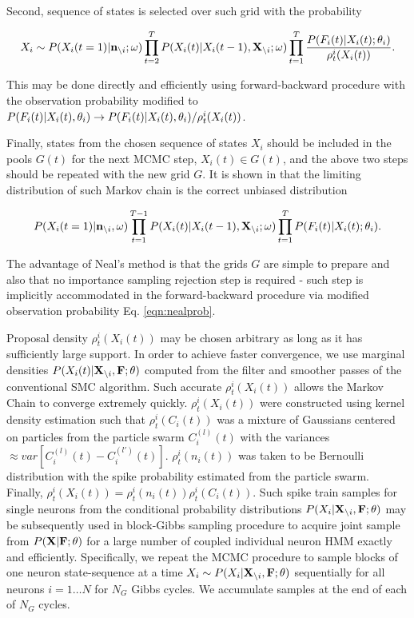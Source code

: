 Second, sequence of states is selected over such grid with the probability

\begin{equation}\label{eqn:nealprob}
X_i\sim P(X_i(t=1)|{\bf n}_{\backslash i}; \mathbf{\omega})\prod\limits_{t=2}^{T}P(X_i(t)|X_i(t-1), {\bf X}_{\backslash i}; \mathbf{\omega}) \prod\limits_{t=1}^{T}
\frac{P(F_i(t)|X_i(t); \mathbf{\theta}_i)}{\rho^i_t(X_i(t))}.
\end{equation}

This may be done directly and efficiently using forward-backward procedure with the observation probability modified to $P(F_i(t)|X_i(t), \mathbf{\theta}_i)\rightarrow P(F_i(t)|X_i(t), \mathbf{\theta}_i)/{\rho^i_t(X_i(t))}$.

Finally, states from the chosen sequence of states $X_i$ should be included in the pools $G(t)$ for the next MCMC step, $X_i(t)\in G(t)$, and the above two steps should be repeated with the new grid $G$. It is shown in \cite{NBR03} that the limiting distribution of such Markov chain is the correct unbiased distribution

\begin{equation}
P(X_i(t=1)|{\bf n}_{\backslash i}, \mathbf{\omega})\prod\limits_{t=1}^{T-1}P(X_i(t)|X_i(t-1), {\bf X}_{\backslash i}; \mathbf{\omega})\prod\limits_{t=1}^{T}P(F_i(t)|X_i(t); \mathbf{\theta}_i).
\end{equation}

The advantage of Neal's method is that the grids $G$ are simple to prepare and also that no importance sampling rejection step is required - such step is implicitly accommodated in the forward-backward procedure via modified observation probability Eq. \eqref{eqn:nealprob}.

Proposal density $\rho^i_t(X_i(t))$ may be chosen arbitrary as long as it has sufficiently large support.  In order to achieve faster convergence, we use marginal densities $P(X_i(t)|{\bf X}_{\backslash i}, \bf F; \theta)$ computed from the filter and smoother passes of the conventional SMC algorithm. Such accurate $\rho^i_t(X_i(t))$ allows the Markov Chain to converge extremely quickly.  $\rho^i_t(X_i(t))$ were constructed using kernel density estimation such that $\rho^i_t(C_i(t))$ was a mixture of Gaussians centered on particles from the particle swarm $C_i^{(l)}(t)$ with the variances $\approx var\left[C_i^{(l)}(t)-C_i^{(l')}(t) \right]$. $\rho^i_t(n_i(t))$ was taken to be Bernoulli distribution with the spike probability estimated from the particle swarm. Finally, $\rho^i_t(X_i(t)) = \rho^i_t(n_i(t)) \rho^i_t(C_i(t))$.  Such spike train samples for single neurons from the conditional probability distributions $P(X_i|{\bf X}_{\backslash i}, \bf F; \theta)$ may be subsequently used in block-Gibbs sampling procedure to acquire joint sample from $P({\bf X}| {\bf F}; \theta)$ for a large number of coupled individual neuron HMM exactly and efficiently.  Specifically, we repeat the MCMC procedure to sample blocks of one neuron state-sequence at a time $X_i\sim P(X_{i}|{\bf X}_{\backslash i},{\bf F}; \theta)$ sequentially for all neurons $i=1\ldots N$ for $N_G$ Gibbs cycles.  We accumulate samples at the end of each of $N_G$ cycles.

